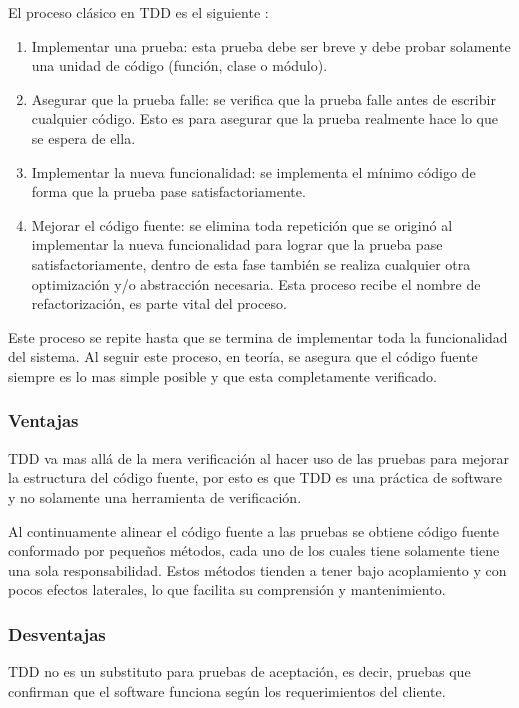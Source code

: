 \vspace{2.5mm}

El proceso clásico en TDD es el siguiente \cite{12_rappin_2010}:
\begin{enumerate}
\item Implementar una prueba: esta prueba debe ser breve y debe probar
  solamente una unidad de código (función, clase o módulo).
\item Asegurar que la prueba falle: se verifica que la prueba falle antes
  de escribir cualquier código. Esto es para asegurar que la prueba realmente
  hace lo que se espera de ella.
\item Implementar la nueva funcionalidad: se implementa el mínimo código de
  forma que la prueba pase satisfactoriamente.
\item Mejorar el código fuente: se elimina toda repetición que se originó al
  implementar la nueva funcionalidad para lograr que la prueba pase
  satisfactoriamente, dentro de esta fase también se realiza cualquier
  otra optimización y/o abstracción necesaria. Esta proceso recibe el nombre de
  refactorización, es parte vital del proceso.
\end{enumerate}

Este proceso se repite hasta que se termina de implementar toda la funcionalidad
del sistema. Al seguir este proceso, en teoría, se asegura que el código fuente
siempre es lo mas simple posible y que esta completamente verificado.

\subsubsection{Ventajas}
TDD va mas allá de la mera verificación al hacer uso de las pruebas para
mejorar la estructura del código fuente, por esto es que TDD es una práctica
de software y no solamente una herramienta de verificación.

Al continuamente alinear el código fuente a las pruebas se obtiene código fuente
conformado por pequeños métodos, cada uno de los cuales tiene solamente tiene
una sola responsabilidad. Estos métodos tienden a tener bajo acoplamiento y
con pocos efectos laterales, lo que facilita su comprensión y mantenimiento.

\subsubsection{Desventajas}
TDD no es un substituto para pruebas de aceptación, es decir, pruebas que confirman
que el software funciona según los requerimientos del cliente.


